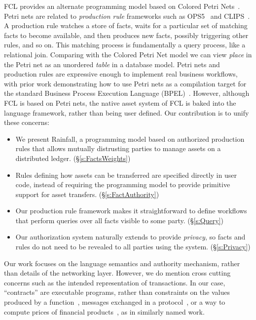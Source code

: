 FCL provides an alternate programming model based on Colored Petri Nets~\cite{Jensen1981:ColouredPetri}. Petri nets are related to \emph{production rule} frameworks such as OPS5~\cite{Forgy1981:OPS5} and CLIPS~\cite{Riley2017:CLIPS}. A production rule watches a store of facts, waits for a particular set of matching facts to become available, and then produces new facts, possibly triggering other rules, and so on. This matching process is fundamentally a query process, like a relational join. Comparing with the Colored Petri Net model we can view \emph{place} in the Petri net as an unordered \emph{table} in a database model. Petri nets and production rules are expressive enough to implement real business workflows, with prior work demonstrating how to use Petri nets as a compilation target for the standard Business Process Execution Language (BPEL)~\cite{Lohmann2009:PetriBPEL}.  However, although FCL is based on Petri nets, the native asset system of FCL is baked into the language framework, rather than being user defined. Our contribution is to unify these concerns:


\begin{itemize}
\item We present Rainfall, a programming model based on authorized production rules that allows mutually distrusting parties to manage assets on a distributed ledger. (\S\ref{s:FactsWeights})

\item Rules defining how assets can be transferred are specified directly in user code, instead of requiring the programming model to provide primitive support for asset transfers. (\S\ref{s:FactAuthority})

\item Our production rule framework makes it straightforward to define workflows that perform queries over all facts visible to some party. (\S\ref{s:Query})

\item Our authorization system naturally extends to provide \emph{privacy}, so facts and rules do not need to be revealed to all parties using the system. (\S\ref{s:Privacy})

\end{itemize}

Our work focuses on the language semantics and authority mechanism, rather than details of the networking layer. However, we do mention cross cutting concerns such as the intended representation of transactions. In our case, ``contracts'' are executable programs, rather than constraints on the values produced by a function~\cite{Findler2002:Contracts}, messages exchanged in a protocol~\cite{Das2019:Resource, Deon2019:CSL}, or a way to compute prices of financial products~\cite{PeytonJones2000:Composing}, as in similarly named work.




